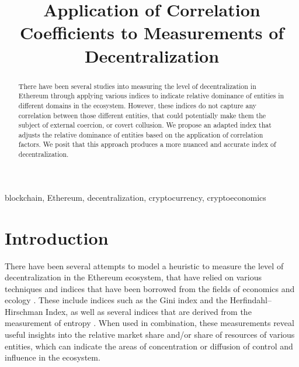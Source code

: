 \documentclass[conference]{IEEEtran}
\begin{document}
\title{Application of Correlation Coefficients to Measurements of Decentralization}

\author{
  \and
}

\maketitle

\begin{abstract}
There have been several studies into measuring the level of decentralization in Ethereum through applying various indices to indicate relative dominance of entities in different domains in the ecosystem.  However, these indices do not capture any correlation between those different entities, that could potentially make them the subject of external coercion, or covert collusion.  We propose an adapted index that adjusts the relative dominance of entities based on the application of correlation factors.  We posit that this approach produces a more nuanced and accurate index of decentralization.
\end{abstract}

\begin{IEEEkeywords}
blockchain, Ethereum, decentralization, cryptocurrency, cryptoeconomics
\end{IEEEkeywords}

\section{Introduction}

There have been several attempts to model a heuristic to measure the level of decentralization in the Ethereum ecosystem, that have relied on various techniques and indices that have been borrowed from the fields of economics and ecology \cite{wu2020coefficient} \cite{gupta2018gini} \cite{gochhayat2020measuring} \cite{lee2021dq}.  These include indices such as the Gini index and the Herfindahl–Hirschman Index, as well as several indices that are derived from the measurement of entropy \cite{brown2023measuring}.  When used in combination, these measurements reveal useful insights into the relative market share and/or share of resources of various entities, which can indicate the areas of concentration or diffusion of control and influence in the ecosystem.
\end{document}
